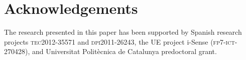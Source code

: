 \documentclass[
  review,
  twocolumn,
  5p,
  sort&compress,
]{elsarticle}
\begin{document}












\section*{Acknowledgements}

The research presented in this paper has been supported by Spanish
research projects \textsc{tec2012-35571} and \textsc{dpi2011-26243},
the UE project i-Sense (\textsc{fp7-ict-270428}), and Universitat
Polit\`{e}cnica de Catalunya predoctoral grant.




\end{document}
